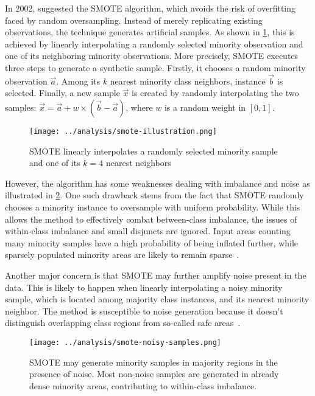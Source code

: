\documentclass[sort&compress]{elsarticle}
\begin{document}
In 2002, \citet{Chawla.2002} suggested the \ac{SMOTE} algorithm, which avoids
the risk of overfitting faced by random oversampling. Instead of merely
replicating existing observations, the technique generates artificial samples.
As shown in  \cref{fig:smote-illustration}, this is achieved by linearly
interpolating a randomly selected minority observation and one of its
neighboring minority observations. More precisely, \ac{SMOTE} executes three
steps to generate a synthetic sample. Firstly, it chooses a random minority
observation $\vec{a}$. Among its $k$ nearest minority class neighbors, instance
$\vec{b}$ is selected. Finally, a new sample $\vec{x}$ is created by randomly
interpolating the two samples: $\vec{x} = \vec{a} + w \times (\vec{b} -
\vec{a})$, where $w$ is a random weight in $[0,1]$.

\begin{figure}[ht]
    \centering
	\texttt{[image: ../analysis/smote-illustration.png]}
	\caption{\acs{SMOTE} linearly interpolates a randomly selected minority 
	sample and one of its $k=4$ nearest neighbors}
	\label{fig:smote-illustration}
\end{figure}

However, the algorithm has some weaknesses dealing with imbalance and noise as
illustrated in \cref{fig:smote-noisy-samples}. One such drawback stems from the
fact that \ac{SMOTE} randomly chooses a minority instance to oversample with
uniform probability. While this allows the method to effectively combat
between-class imbalance, the issues of within-class imbalance and small
disjuncts are ignored. Input areas counting many minority samples have a high
probability of being inflated further, while sparsely populated minority areas
are likely to remain sparse~\citep{Prati.2004}.

Another major concern is that \ac{SMOTE} may further amplify noise present in
the data. This is likely to happen when linearly interpolating a noisy minority
sample, which is located among majority class instances, and its nearest
minority neighbor. The method is susceptible to noise generation because it
doesn't distinguish overlapping class regions from so-called safe
areas~\citep{Bunkhumpornpat.2009,Rivera.2017,Zhu.2017,Saez.2015}. 

\begin{figure}[ht]
    \centering
	\texttt{[image: ../analysis/smote-noisy-samples.png]}
	\caption[Behavior of \acs{SMOTE} in the presence of noise and within-class imbalance]
	{\acs{SMOTE} may generate minority samples in majority regions in the presence of noise. 
	Most non-noise samples are generated in already dense minority areas, contributing 
	to within-class imbalance.}
	\label{fig:smote-noisy-samples}
\end{figure}
\end{document}
